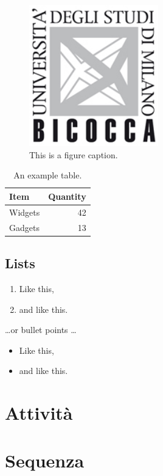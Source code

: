 \documentclass[12pt]{article}
\begin{document}
\begin{figure}
\centering
\includegraphics[width=0.5\textwidth]{logo.jpg}
\caption{\label{fig:frog}This is a figure caption.}
\end{figure}

\begin{table}
\centering
\begin{tabular}{l|r}
Item & Quantity \\\hline
Widgets & 42 \\
Gadgets & 13
\end{tabular}
\caption{\label{tab:widgets}An example table.}
\end{table}

\subsection{Lists}

\begin{enumerate}
\item Like this,
\item and like this.
\end{enumerate}
\dots or bullet points \dots
\begin{itemize}
\item Like this,
\item and like this.
\end{itemize}

\section{Attività}

\section{Sequenza}
\end{document}
